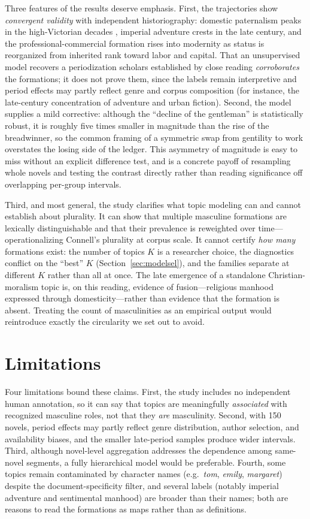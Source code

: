\documentclass[11pt]{article}
\begin{document}
Three features of the results deserve emphasis. First, the trajectories show
\emph{convergent validity} with independent historiography: domestic paternalism
peaks in the high-Victorian decades \citep{tosh1999mans}, imperial adventure
crests in the late century, and the professional-commercial formation rises into
modernity as status is reorganized from inherited rank toward labor and capital.
That an unsupervised model recovers a periodization scholars established by close
reading \emph{corroborates} the formations; it does not prove them, since the
labels remain interpretive and period effects may partly reflect genre and corpus
composition (for instance, the late-century concentration of adventure and urban
fiction). Second, the model supplies a mild corrective: although the ``decline of
the gentleman'' is statistically robust, it is roughly five times smaller in
magnitude than the rise of the breadwinner, so the common framing of a symmetric
swap from gentility to work overstates the losing side of the ledger. This
asymmetry of magnitude is easy to miss without an explicit difference test, and
is a concrete payoff of resampling whole novels and testing the contrast directly
rather than reading significance off overlapping per-group intervals.

Third, and most general, the study clarifies what topic modeling can and cannot
establish about plurality. It can show that multiple masculine formations are
lexically distinguishable and that their prevalence is reweighted over time---
operationalizing Connell's plurality at corpus scale. It cannot certify
\emph{how many} formations exist: the number of topics $K$ is a researcher choice,
the diagnostics conflict on the ``best'' $K$ (Section~\ref{sec:modelsel}), and the
families separate at different $K$ rather than all at once. The late emergence of
a standalone Christian-moralism topic is, on this reading, evidence of
fusion---religious manhood expressed through domesticity---rather than evidence
that the formation is absent. Treating the count of masculinities as an empirical
output would reintroduce exactly the circularity we set out to avoid.

\section{Limitations}

Four limitations bound these claims. First, the study includes no independent
human annotation, so it can say that topics are meaningfully \emph{associated}
with recognized masculine roles, not that they \emph{are} masculinity. Second,
with 150 novels, period effects may partly reflect genre distribution, author
selection, and availability biases, and the smaller late-period samples produce
wider intervals. Third, although novel-level aggregation addresses the dependence
among same-novel segments, a fully hierarchical model would be preferable.
Fourth, some topics remain contaminated by character names (e.g.\ \emph{tom},
\emph{emily}, \emph{margaret}) despite the document-specificity filter, and
several labels (notably imperial adventure and sentimental manhood) are broader
than their names; both are reasons to read the formations as maps rather than as
definitions.
\end{document}
